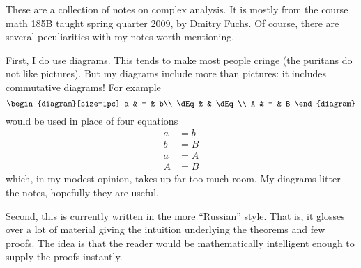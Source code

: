 These are a collection of notes on complex analysis. It is mostly
from the course math 185B taught spring quarter 2009, by Dmitry
Fuchs. Of course, there are several peculiarities with my notes
worth mentioning.

First, I do use diagrams. This tends to make most people cringe
(the puritans do not like pictures). But my diagrams include more
than pictures: it includes commutative diagrams! For example
\begin{equation}
\begin{diagram}[size=1pc]
a    & = & b\\
\dEq &      & \dEq \\
A    & = & B
\end{diagram}
\end{equation} 
would be used in place of four equations
\begin{subequations}
\begin{align}
a&=b\\
b&=B\\
a&=A\\
A&=B
\end{align}
\end{subequations}
which, in my modest opinion, takes up far too much room. My
diagrams litter the notes, hopefully they are useful.

Second, this is currently written in the more ``Russian''
style. That is, it glosses over a lot of material giving the
intuition underlying the theorems and few proofs. The idea is
that the reader would be mathematically intelligent enough to
supply the proofs instantly.
